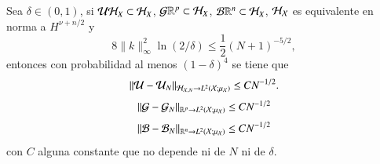 \begin{teo}
    Sea $\delta \in (0, 1)$, si $\mathcal{U} \mathcal{H}_X \subset \mathcal{H}_X$, $\mathcal{G} \mathbb{R}^p \subset \mathcal{H}_X$, $\mathcal{B} \mathbb{R}^n \subset \mathcal{H}_X$, $\mathcal{H}_{\mathcal{X}}$ es equivalente en norma a $H^{\nu + n/2}$ y 
    \[
    8\|k\|^2_\infty \ln(2/\delta) \leq \frac{1}{2} (N+1)^{-5/2},
    \]
    entonces con probabilidad al menos $(1-\delta)^4$ se tiene que
     \begin{equation*}
        \| \mathcal{U} - \mathcal{U}_N \|_{\mathcal{H}_{\mathcal{X}, N} \to L^2(\mathcal{X}; \mu_{\mathcal{X}})} \leq C N^{-1/2}.
    \end{equation*}
    \begin{equation*}
    \| \mathcal{G} - \mathcal{G}_N \|_{\mathbb{R}^p \to L^2(\mathcal{X}; \mu_{\mathcal{X}})} \leq C N^{-1/2}
    \end{equation*}
    \begin{equation*}
    \| \mathcal{B} - \mathcal{B}_N \|_{\mathbb{R}^n \to L^2(\mathcal{X}; \mu_{\mathcal{X}})} \leq C N^{-1/2}
    \end{equation*}
    con $C$ alguna constante que no depende ni de $N$ ni de $\delta$.
\end{teo}

